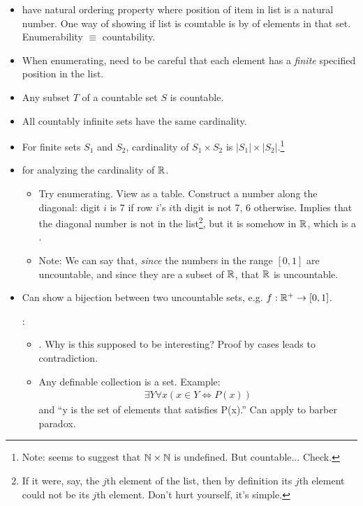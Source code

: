 \documentclass[12pt]{article}
\begin{document}
\begin{itemize}
	\item {} have natural ordering property where position of item in list is a natural number. One way of showing if list is countable is by  of elements in that set. Enumerability $\equiv$ countability. 
	\item When enumerating, need to be careful that each element has a \textit{finite} specified position in the list. 
	\item \Lemma Any subset $T$ of a countable set $S$ is countable. 
	\item All countably infinite sets have the same cardinality. 
	\item For finite sets $S_1$ and $S_2$, cardinality of $S_1 \times S_2$ is $|S_1| \times |S_2|$.\footnote{Note: seems to suggest that $\mathbb{N} \times \mathbb{N}$ is undefined. But countable... Check.}
	\item {} for analyzing the cardinality of $\mathbb{R}$. 
	\begin{itemize}
		\item Try enumerating. View as a table. Construct a number along the diagonal: digit $i$ is 7 if row $i$'s $i$th digit is not 7, 6 otherwise. Implies that the diagonal number is not in the list\footnote{If it were, say, the $j$th element of the list, then by definition its $j$th element could not be its $j$th element. Don't hurt yourself, it's simple.}, but it is somehow in $\mathbb{R}$, which is a . 
		\item Note: We can say that, \textit{since} the numbers in the range $[0, 1]$ are uncountable, and since they are a subset of $\mathbb{R}$, that $\mathbb{R}$ is uncountable. 
	\end{itemize}
	
	\item Can show a bijection between two uncountable sets, e.g. $f: \mathbb{R}^+ \rightarrow [0, 1]$. 
	
	:
	\begin{itemize}
		\item {}. Why is this supposed to be interesting? Proof by cases leads to contradiction.  
		
		\item Any definable collection is a set. Example:
		\begin{align}
		\exists Y \forall x (x \in Y \iff P(x))
		\end{align}
		and ``y is the set of elements that satisfies P(x).'' Can apply to barber paradox. 
		

\end{itemize}
\end{itemize}
\end{document}
